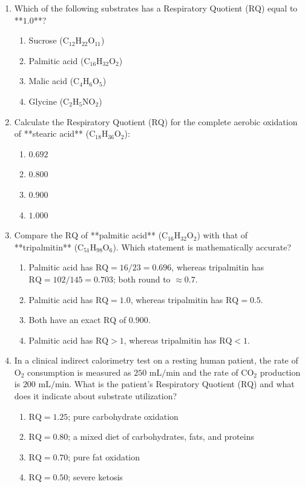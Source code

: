 \documentclass[11pt, a4paper]{article}
\begin{document}
\begin{enumerate}[label=\textbf{\arabic*.}]
\item Which of the following substrates has a Respiratory Quotient ($\text{RQ}$) equal to **$1.0$**?
\begin{enumerate}[label=(\Alph*)]
    \item Sucrose ($\text{C}_{12}\text{H}_{22}\text{O}_{11}$)
    \item Palmitic acid ($\text{C}_{16}\text{H}_{32}\text{O}_2$)
    \item Malic acid ($\text{C}_4\text{H}_6\text{O}_5$)
    \item Glycine ($\text{C}_2\text{H}_5\text{NO}_2$)
\end{enumerate}

\item Calculate the Respiratory Quotient ($\text{RQ}$) for the complete aerobic oxidation of **stearic acid** ($\text{C}_{18}\text{H}_{36}\text{O}_2$):
\begin{enumerate}[label=(\Alph*)]
    \item $0.692$
    \item $0.800$
    \item $0.900$
    \item $1.000$
\end{enumerate}

\item Compare the $\text{RQ}$ of **palmitic acid** ($\text{C}_{16}\text{H}_{32}\text{O}_2$) with that of **tripalmitin** ($\text{C}_{51}\text{H}_{98}\text{O}_6$). Which statement is mathematically accurate?
\begin{enumerate}[label=(\Alph*)]
    \item Palmitic acid has $\text{RQ} = 16 / 23 = 0.696$, whereas tripalmitin has $\text{RQ} = 102 / 145 = 0.703$; both round to $\approx 0.7$.
    \item Palmitic acid has $\text{RQ} = 1.0$, whereas tripalmitin has $\text{RQ} = 0.5$.
    \item Both have an exact $\text{RQ}$ of $0.900$.
    \item Palmitic acid has $\text{RQ} > 1$, whereas tripalmitin has $\text{RQ} < 1$.
\end{enumerate}

\item In a clinical indirect calorimetry test on a resting human patient, the rate of $\text{O}_2$ consumption is measured as $250\text{ mL/min}$ and the rate of $\text{CO}_2$ production is $200\text{ mL/min}$. What is the patient's Respiratory Quotient ($\text{RQ}$) and what does it indicate about substrate utilization?
\begin{enumerate}[label=(\Alph*)]
    \item $\text{RQ} = 1.25$; pure carbohydrate oxidation
    \item $\text{RQ} = 0.80$; a mixed diet of carbohydrates, fats, and proteins
    \item $\text{RQ} = 0.70$; pure fat oxidation
    \item $\text{RQ} = 0.50$; severe ketosis
\end{enumerate}


\end{enumerate}
\end{document}
